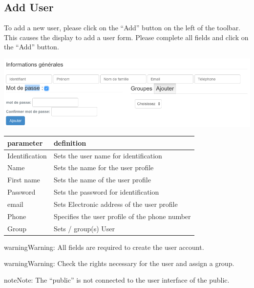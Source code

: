 \documentclass[letterpaper,10pt,english]{sphinxmanual}
\begin{document}
\subsection{Add User}
\label{dashboard/usersmanagement:ajouter-un-utilisateur}
To add a new user, please click on the ``Add'' button on the left of the toolbar. This causes the display to add a user form. Please complete all fields and click on the ``Add'' button.

\includegraphics[width=1.000\linewidth]{dashboard-adduser-form.png}

\begin{tabulary}{\linewidth}{|L|L|}
\hline

\textbf{parameter}
 & 
\textbf{definition}
\\
\hline
Identification
 & 
Sets the user name for identification
\\
\hline
Name
 & 
Sets the name for the user profile
\\
\hline
First name
 & 
Sets the name of the user profile
\\
\hline
Password
 & 
Sets the password for identification
\\
\hline
email
 & 
Sets Electronic address of the user profile
\\
\hline
Phone
 & 
Specifies the user profile of the phone number
\\
\hline
Group
 & 
Sets / group(s) User
\\
\hline\end{tabulary}


\begin{notice}{warning}{Warning:}
All fields are required to create the user account.
\end{notice}

\begin{notice}{warning}{Warning:}
Check the rights necessary for the user and assign a group.
\end{notice}

\begin{notice}{note}{Note:}
The ``public'' is not connected to the user interface of the public.
\end{notice}
\end{document}
